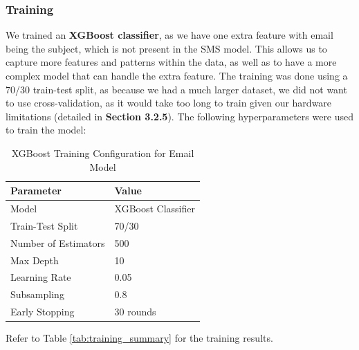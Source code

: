 \documentclass{article}
\begin{document}
\subsubsection*{Training}
We trained an \textbf{XGBoost classifier}, as we have one extra feature with email being the subject, which is not present in the SMS model. This allows us to capture more features and patterns within the data, as well as to have a more complex model that can handle the extra feature. The training was done using a 70/30 train-test split, as because we had a much larger dataset, we did not want to use cross-validation, as it would take too long to train given our hardware limitations (detailed in \textbf{Section 3.2.5}). The following hyperparameters were used to train the model:

\begin{table}[h!]
    \centering
    \renewcommand{\arraystretch}{1.2}
    \setlength{\tabcolsep}{11pt}
    \begin{tabular}{|l|l|}
        \hline
        \textbf{Parameter} & \textbf{Value} \\
        \hline
        Model & XGBoost Classifier \\
        \hline
        Train-Test Split & 70/30 \\
        \hline
        Number of Estimators & 500 \\
        \hline
        Max Depth & 10 \\
        \hline
        Learning Rate & 0.05 \\
        \hline
        Subsampling & 0.8 \\
        \hline
        Early Stopping & 30 rounds \\
        \hline
    \end{tabular}
    \caption{XGBoost Training Configuration for Email Model}
\end{table}

\newpage

\noindent
Refer to Table \ref{tab:training_summary} for the training results.

\end{document}
